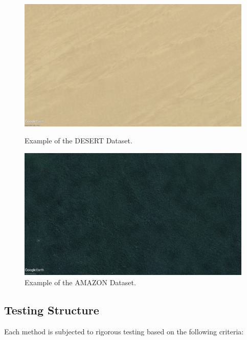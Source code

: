 \begin{figure}[H]
    \begin{minipage}{0.4\textwidth}
        \centering
        \includegraphics[width=\textwidth]{./Chapter 4/DEMODATASETS/DESERT1.jpg}
        \caption{Example of the DESERT Dataset.}
        \label{fig:DESERT}
    \end{minipage}\hfill
    \begin{minipage}{0.4\textwidth}
        \centering
        \includegraphics[width=\textwidth]{./Chapter 4/DEMODATASETS/AMAZON.jpg}
        \caption{Example of the AMAZON Dataset.}
        \label{fig:AMAZON}
    \end{minipage}
    
\end{figure}



\subsection{Testing Structure}

Each method is subjected to rigorous testing based on the following criteria:




